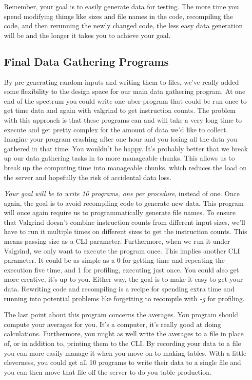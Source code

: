 \documentclass[]{tufte-handout}
\begin{document}
Remember, your goal is to easily generate data for testing.  The more time you spend modifying things like sizes and file names in the code, recompiling the code, and then rerunning the newly changed code, the less easy data generation will be and the longer it takes you to achieve your goal. 

\subsection{Final Data Gathering Programs}

By pre-generating random inputs and writing them to files, we've really added some flexibility to the design space for our main data gathering program. At one end of the spectrum you could write one uber-program that could be run once to get time data and again with valgrind to get instruction counts. The problem with this approach is that these programs can and will take a very long time to execute and get pretty complex for the amount of data we'd like to collect. Imagine your program crashing after one hour and you losing all the data you gathered in that time.  You wouldn't be happy.  It's probably better that we break up our data gathering tasks in to more manageable chunks. This allows us to break up the computing time into manageable chunks, which reduces the load on the server and hopefully the risk of accidental data loss.

\textit{Your goal will be to write 10 programs, one per procedure}, instead of one.  Once again, the goal is to avoid recompiling code to generate new data. This program will once again require us to programmatically generate file names. To ensure that Valgrind doesn't combine instruction counts from different input sizes, we'll have to run it multiple times on different sizes to get the instruction counts. This means passing size as a CLI parameter. Furthermore, when we run it under Valgrind, we only want to execute the program once. This implies another CLI parameter. It could be as simple as a 0 for getting time and repeating the execution five time, and 1 for profiling, executing just once. You could also get more creative, it's up to you. Either way, the goal is to make it easy to get your data. Rewriting code and recompiling is a recipe for spending extra time and running into potential problems like forgetting to recompile with \textit{-g} for profiling.

The last point about this program concerns the averages. You program should compute your averages for you. It's a computer, it's really good at doing calculations. Furthermore, you might as well write the averages to a file in place of, or in addition to, printing them to the CLI. By recording your data to a file you can more easily manage it when you move on to making tables. With a little cleverness, you could get all 10 programs to write their data to a single file and you can then move that file off the server to do you table production.
\end{document}
